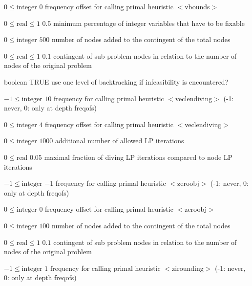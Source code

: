 %
{$0\leq\textrm{integer}$}%
{$0$}%
{frequency offset for calling primal heuristic $<$vbounds$>$}%
{}

%
{$0\leq\textrm{real}\leq1$}%
{$0.5$}%
{minimum percentage of integer variables that have to be fixable}%
{}

%
{$0\leq\textrm{integer}$}%
{$500$}%
{number of nodes added to the contingent of the total nodes}%
{}

%
{$0\leq\textrm{real}\leq1$}%
{$0.1$}%
{contingent of sub problem nodes in relation to the number of nodes of the original problem}%
{}

%
{boolean}%
{TRUE}%
{use one level of backtracking if infeasibility is encountered?}%
{}

%
{$-1\leq\textrm{integer}$}%
{$10$}%
{frequency for calling primal heuristic $<$veclendiving$>$ (-1: never, 0: only at depth freqofs)}%
{}

%
{$0\leq\textrm{integer}$}%
{$4$}%
{frequency offset for calling primal heuristic $<$veclendiving$>$}%
{}

%
{$0\leq\textrm{integer}$}%
{$1000$}%
{additional number of allowed LP iterations}%
{}

%
{$0\leq\textrm{real}$}%
{$0.05$}%
{maximal fraction of diving LP iterations compared to node LP iterations}%
{}

%
{$-1\leq\textrm{integer}$}%
{$-1$}%
{frequency for calling primal heuristic $<$zeroobj$>$ (-1: never, 0: only at depth freqofs)}%
{}

%
{$0\leq\textrm{integer}$}%
{$0$}%
{frequency offset for calling primal heuristic $<$zeroobj$>$}%
{}

%
{$0\leq\textrm{integer}$}%
{$100$}%
{number of nodes added to the contingent of the total nodes}%
{}

%
{$0\leq\textrm{real}\leq1$}%
{$0.1$}%
{contingent of sub problem nodes in relation to the number of nodes of the original problem}%
{}

%
{$-1\leq\textrm{integer}$}%
{$1$}%
{frequency for calling primal heuristic $<$zirounding$>$ (-1: never, 0: only at depth freqofs)}%
{}

